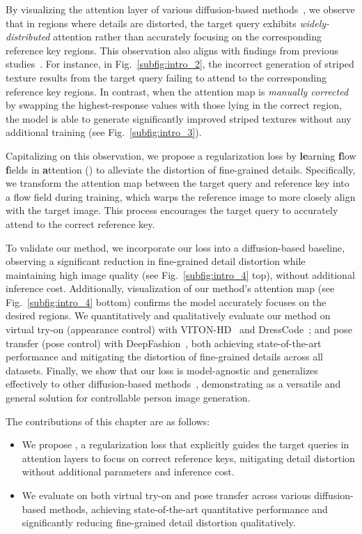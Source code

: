 By visualizing the attention layer of various diffusion-based methods~\citep{choi2024improving, xu2024ootdiffusion}, we observe that in regions where details are distorted, the target query exhibits \textit{widely-distributed} attention rather than accurately focusing on the corresponding reference key regions.
This observation also aligns with findings from previous studies~\citep{kim2024stableviton, ren2022neural}.
For instance, in Fig.~\ref{subfig:intro_2}, the incorrect generation of striped texture results from the target query failing to attend to the corresponding reference key regions.
In contrast, when the attention map is \textit{manually corrected} by swapping the highest-response values with those lying in the correct region, the model is able to generate significantly improved striped textures without any additional training (see Fig.~\ref{subfig:intro_3}).

Capitalizing on this observation, we propose a regularization loss by \textbf{le}arning \textbf{f}low \textbf{f}ields in \textbf{a}ttention (\textbf{\leffa{}}) to alleviate the distortion of fine-grained details.
Specifically, we transform the attention map between the target query and reference key into a flow field during training, which warps the reference image to more closely align with the target image. This process encourages the target query to accurately attend to the correct reference key.

To validate our method, we incorporate our \leffa{} loss into a diffusion-based baseline, observing a significant reduction in fine-grained detail distortion while maintaining high image quality (see Fig.~\ref{subfig:intro_4} top), without additional inference cost.
Additionally, visualization of our method's attention map (see Fig.~\ref{subfig:intro_4} bottom) confirms the model accurately focuses on the desired regions.
We quantitatively and qualitatively evaluate our method on virtual try-on (appearance control) with VITON-HD~\citep{choi2021viton} and DressCode~\citep{morelli2022dress}; and pose transfer (pose control) with DeepFashion~\citep{liu2016deepfashion}, both achieving state-of-the-art performance and mitigating the distortion of fine-grained details across all datasets.
Finally, we show that our \leffa{} loss is model-agnostic and generalizes effectively to other diffusion-based methods~\citep{choi2024improving, chong2024catvton}, demonstrating \leffa{} as a versatile and general solution for controllable person image generation.

The contributions of this chapter are as follows:
\begin{itemize}
    \item We propose \leffa{}, a regularization loss that explicitly guides the target queries in attention layers to focus on correct reference keys, mitigating detail distortion without additional parameters and inference cost. 
    \item We evaluate \leffa{} on both virtual try-on and pose transfer across various diffusion-based methods, achieving state-of-the-art quantitative performance and significantly reducing fine-grained detail distortion qualitatively.
\end{itemize}

